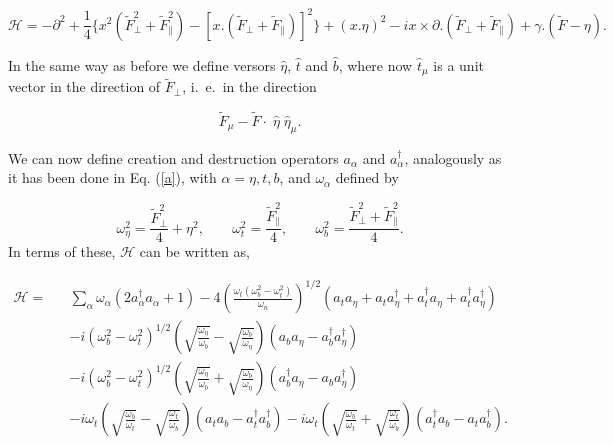 \documentclass[a4paper,12pt]{article}
\newcommand{\Fd}{\widetilde{F}}
\newcommand{\n}{\eta}
\newcommand{\w}{\omega}
\begin{document}
\begin{equation}\label{Hgral}
{\mathcal
H}=-\partial^2+\frac{1}{4}\{x^2(\Fd_\bot^2+\Fd_\|^2)-[x.(\Fd_\bot+\Fd_\|)]^2\}+
(x.\n)^2-ix \times \partial.(\Fd_\bot+\Fd_\|)+\gamma.(\Fd-\n).
\end{equation}

In the same way as before we define versors $\hat{\n}$, $\hat{t}$ and
$\hat{b}$, where now $\hat{t}_{\mu}$ is a unit vector in the direction of
$\Fd_\bot$, i.\ e.\ in the direction

\begin{equation}
\Fd_\mu - \Fd \cdot \; \hat{\n}\; \hat{\n}_\mu.
\end{equation}

We can now define creation and destruction operators $a_{\alpha}$ and
$a_{\alpha}^\dagger$, analogously as it has been done in Eq. (\ref{a}), with
$\alpha=\n,t,b$, and $\w_\alpha$ defined by

\begin{equation}\label{wgral}
\w_\n^2=\frac{\Fd_\bot^2}{4}+\n^2,\;\;\;\;\;\;\;
\w_t^2=\frac{\Fd_\|^2}{4},\;\;\;\;\;\;\;\w_b^2=\frac{\Fd_\bot^2+\Fd_\|^2}{4}.
\end{equation}
In terms of these, $\mathcal {H}$ can be written as,

\begin{eqnarray}\label{wgral}
{\mathcal H}=& & \sum_{\alpha}\w_\alpha (2a_\alpha^\dagger a_\alpha + 1) -
4(\frac{\w_t(\w_b^2-\w_t^2)}{\w_n})^{1/2} (a_ta_\n+a_t
a_\n^\dagger+a_t^\dagger a_\n+a_t^\dagger a_\n^\dagger)
\nonumber \\ &
&-i(\w_b^2-\w_t^2)^{1/2}(\sqrt{\frac{\w_\n}{\w_b}}-\sqrt{\frac{\w_b}{\w_\n}})
(a_ba_\n - a_b^\dagger a_\n^\dagger)  \nonumber \\ & &  -
i(\w_b^2-\w_t^2)^{1/2}(\sqrt{\frac{\w_\n}{\w_b}}+\sqrt{\frac{\w_b}{\w_\n}})
(a_b^\dagger a_\n - a_b a_\n^\dagger)  \nonumber \\ & & - i \w_t
(\sqrt{\frac{\w_b}{\w_t}}-\sqrt{\frac{\w_t}{\w_b}}) (a_ta_b -
a_t^\dagger a_b^\dagger) - i \w_t
(\sqrt{\frac{\w_b}{\w_t}}+\sqrt{\frac{\w_t}{\w_b}}) (a_t^\dagger
a_b - a_t a_b^\dagger).\nonumber\\
\end{eqnarray}
\end{document}
